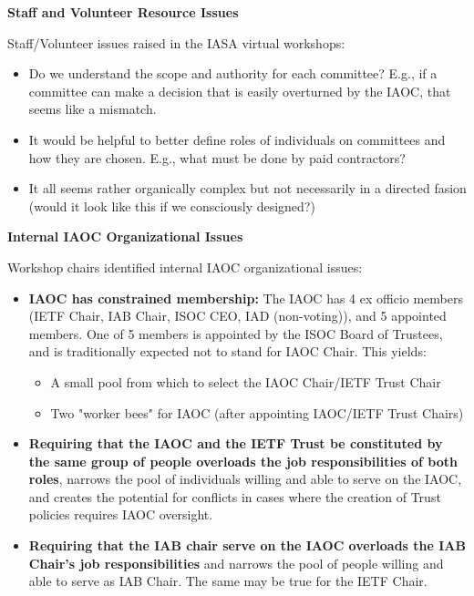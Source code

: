 \documentclass[helvetica]{seminar}
\newcommand{\heading}[1]{%
  \begin{center} 
    \large\bf 
    #1 
  \end{center} 
  \vspace{.4 in}}
\begin{document}
\begin{slide}
\heading{Staff and Volunteer Resource Issues}

Staff/Volunteer issues raised in the IASA virtual workshops:
\begin{itemize}
\item Do we understand the scope and authority for each committee?
  E.g., if a committee can make a decision that is easily overturned
  by the IAOC, that seems like a mismatch.
\item It would be helpful to better define roles of individuals on
  committees and how they are chosen. E.g., what must be done by paid
  contractors?
\item It all seems rather organically complex but not necessarily in a
  directed fasion (would it look like this if we consciously
  designed?)
\end{itemize}

\end{slide}


\begin{slide}
\heading{Internal IAOC Organizational Issues}

Workshop chairs identified internal IAOC organizational issues:
{\footnotesize
\begin{itemize}
\item \textbf{IAOC has constrained membership:} The IAOC has 4 ex
  officio members (IETF Chair, IAB Chair, ISOC CEO, IAD (non-voting)),
  and 5 appointed members.  One of 5 members is appointed by the ISOC
  Board of Trustees, and is traditionally expected not to stand for
  IAOC Chair.  This yields:
  \begin{itemize}
  \item A small pool from which to select the IAOC Chair/IETF Trust
    Chair
  \item Two "worker bees" for IAOC (after appointing IAOC/IETF Trust
    Chairs)
  \end{itemize}
\item \textbf{Requiring that the IAOC and the IETF Trust be
  constituted by the same group of people overloads the job
  responsibilities of both roles}, narrows the pool of individuals
  willing and able to serve on the IAOC, and creates the potential for
  conflicts in cases where the creation of Trust policies requires
  IAOC oversight.
\item \textbf{Requiring that the IAB chair serve on the IAOC overloads
  the IAB Chair's job responsibilities} and narrows the pool of people
  willing and able to serve as IAB Chair.  The same may be true for
  the IETF Chair.
\end{itemize}
}

\end{slide}
\end{document}
